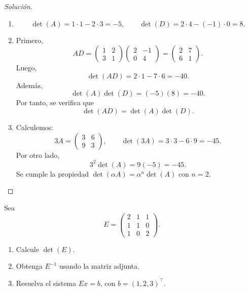 \documentclass[a4,11pt]{aleph-notas}
\begin{document}
\begin{proof}[Solución]\hspace{0pt}
    \begin{enumerate}
    \item
        \[
            \det(A)=1\cdot1-2\cdot3=-5,
            \qquad
            \det(D)=2\cdot4-(-1)\cdot0=8.
        \]
    \item
        Primero,
        \[
            AD=
            \begin{pmatrix}
                1 & 2 \\
                3 & 1
            \end{pmatrix}
            \begin{pmatrix}
                2 & -1 \\
                0 & 4
            \end{pmatrix}
            =
            \begin{pmatrix}
                2 & 7 \\
                6 & 1
            \end{pmatrix}.
        \]
        Luego,
        \[
            \det(AD)=2\cdot1-7\cdot6=-40.
        \]
        Además,
        \[
            \det(A)\det(D)=(-5)(8)=-40.
        \]
        Por tanto, se verifica que
        \[
            \det(AD)=\det(A)\det(D).
        \]
    \item Calculemos:
        \[
            3A=
            \begin{pmatrix}
                3 & 6 \\
                9 & 3
            \end{pmatrix},
            \qquad
            \det(3A)=3\cdot3-6\cdot9=-45.
        \]
        Por otro lado,
        \[
            3^2\det(A)=9(-5)=-45.
        \]
        Se cumple la propiedad $\det(\alpha A)=\alpha^n\det(A)$ con $n=2$.\qedhere
    \end{enumerate}
\end{proof}

\begin{ejer}
    Sea
    \[
        E=
        \begin{pmatrix}
            2 & 1 & 1 \\
            1 & 1 & 0 \\
            1 & 0 & 2
        \end{pmatrix}.
    \]
    
    \begin{enumerate}
    \item
        Calcule $\det(E)$.
    \item
        Obtenga $E^{-1}$ usando la matriz adjunta.
    \item
        Resuelva el sistema $Ex=b$, con $b=(1,2,3)^\intercal$.
    \end{enumerate}
\end{ejer}
\end{document}
